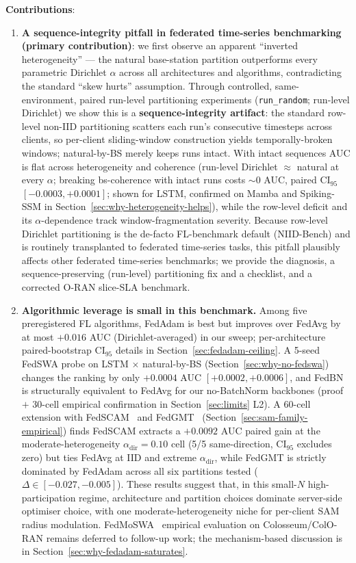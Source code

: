\documentclass[journal]{IEEEtran}
\newcommand{\alphadir}{\ensuremath{\alpha_{\mathrm{dir}}}}
\begin{document}
\textbf{Contributions}:
\begin{enumerate}
    \item \textbf{A sequence-integrity pitfall in federated time-series benchmarking (primary contribution)}: we first observe an apparent ``inverted heterogeneity'' --- the natural base-station partition outperforms every parametric Dirichlet $\alpha$ across all architectures and algorithms, contradicting the standard ``skew hurts'' assumption. Through controlled, same-environment, paired run-level partitioning experiments (\texttt{run\_random}; run-level Dirichlet) we show this is a \textbf{sequence-integrity artifact}: the standard row-level non-IID partitioning scatters each run's consecutive timesteps across clients, so per-client sliding-window construction yields temporally-broken windows; natural-by-BS merely keeps runs intact. With intact sequences AUC is flat across heterogeneity and coherence (run-level Dirichlet $\approx$ natural at every $\alpha$; breaking bs-coherence with intact runs costs ${\sim}0$ AUC, paired CI$_{95}$ $[-0.0003, +0.0001]$; shown for LSTM, confirmed on Mamba and Spiking-SSM in Section~\ref{sec:why-heterogeneity-helps}), while the row-level deficit and its $\alpha$-dependence track window-fragmentation severity. Because row-level Dirichlet partitioning is the de-facto FL-benchmark default (NIID-Bench) and is routinely transplanted to federated time-series tasks, this pitfall plausibly affects other federated time-series benchmarks; we provide the diagnosis, a sequence-preserving (run-level) partitioning fix and a checklist, and a corrected O-RAN slice-SLA benchmark.

    \item \textbf{Algorithmic leverage is small in this benchmark.} Among five preregistered FL algorithms, FedAdam is best but improves over FedAvg by at most $+0.016$ AUC (Dirichlet-averaged) in our sweep; per-architecture paired-bootstrap CI$_{95}$ details in Section~\ref{sec:fedadam-ceiling}. A 5-seed FedSWA probe on LSTM $\times$ natural-by-BS (Section~\ref{sec:why-no-fedswa}) changes the ranking by only $+0.0004$ AUC $[+0.0002, +0.0006]$, and FedBN~\cite{Li2021_FedBN} is structurally equivalent to FedAvg for our no-BatchNorm backbones (proof $+$ 30-cell empirical confirmation in Section~\ref{sec:limits} L2). A 60-cell extension with FedSCAM~\cite{FedSCAM2026} and FedGMT~\cite{FedGMT2025} (Section~\ref{sec:sam-family-empirical}) finds FedSCAM extracts a $+0.0092$ AUC paired gain at the moderate-heterogeneity $\alphadir = 0.10$ cell (5/5 same-direction, CI$_{95}$ excludes zero) but ties FedAvg at IID and extreme $\alphadir$, while FedGMT is strictly dominated by FedAdam across all six partitions tested ($\Delta \in [-0.027, -0.005]$). These results suggest that, in this small-$N$ high-participation regime, architecture and partition choices dominate server-side optimiser choice, with one moderate-heterogeneity niche for per-client SAM radius modulation. FedMoSWA~\cite{FedMoSWA2025} empirical evaluation on Colosseum/ColO-RAN remains deferred to follow-up work; the mechanism-based discussion is in Section~\ref{sec:why-fedadam-saturates}.


\end{enumerate}
\end{document}
